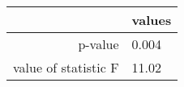 \begin{tabular}{|r|l|}
  \hline
  \rowcolor{Gray}
    & values \\
  \hline
  p-value & 0.004 \\
  \hline
  value of statistic F & 11.02 \\
  \hline
\end{tabular}
